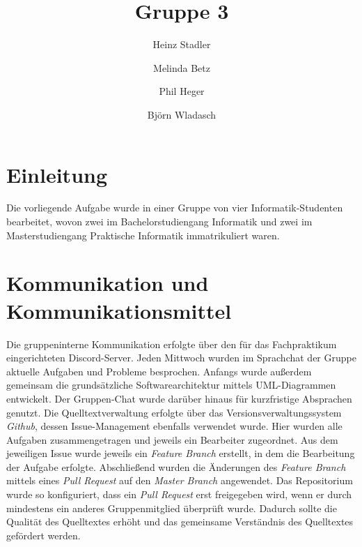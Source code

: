 \documentclass[runningheads]{llncs}
\begin{document}
%
\title{Gruppe 3}
%
%
\author{Heinz Stadler\and
Melinda Betz\and
Phil Heger\and
Björn Wladasch}
%
%
%
\maketitle              %
%
%
\section{Einleitung}
Die vorliegende Aufgabe wurde in einer Gruppe von vier Informatik-Studenten bearbeitet, wovon zwei im Bachelorstudiengang Informatik und zwei im Masterstudiengang Praktische Informatik immatrikuliert waren.

\section{Kommunikation und Kommunikationsmittel}
Die gruppeninterne Kommunikation erfolgte über den für das Fachpraktikum eingerichteten Discord-Server. Jeden Mittwoch wurden im Sprachchat der Gruppe aktuelle Aufgaben und Probleme besprochen. Anfangs wurde außerdem gemeinsam die grundsätzliche Softwarearchitektur mittels UML-Diagrammen entwickelt. Der Gruppen-Chat wurde darüber hinaus für kurzfristige Absprachen genutzt.
Die Quelltextverwaltung erfolgte über das Versionsverwaltungssystem \textit{Github}, dessen Issue-Management ebenfalls verwendet wurde. Hier wurden alle Aufgaben zusammengetragen und jeweils ein Bearbeiter zugeordnet. Aus dem jeweiligen Issue wurde jeweils ein \textit{Feature Branch} erstellt, in dem die Bearbeitung der Aufgabe erfolgte. Abschließend wurden die Änderungen des \textit{Feature Branch} mittels eines \textit{Pull Request} auf den \textit{Master Branch} angewendet. Das Repositorium wurde so konfiguriert, dass ein \textit{Pull Request} erst freigegeben wird, wenn er durch mindestens ein anderes Gruppenmitglied überprüft wurde. Dadurch sollte die Qualität des Quelltextes erhöht und das gemeinsame Verständnis des Quelltextes gefördert werden.
\end{document}
